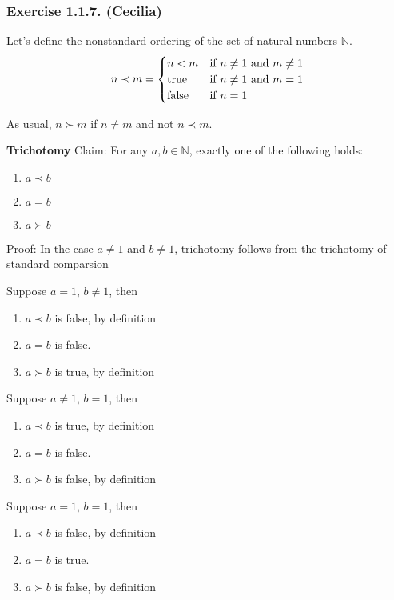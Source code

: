 \subsubsection*{Exercise 1.1.7. (Cecilia)}

\begin{flushleft}

Let's define the nonstandard ordering of the set of natural numbers $\mathbb{N}$.
\begin{equation*}
  n \prec m =
    \begin{cases}
      n < m        & \text{if $ n \ne 1 $ and $ m \ne 1 $} \\
      \text{true}  & \text{if $ n \ne 1 $ and $ m = 1 $} \\
      \text{false} & \text{if $ n = 1 $ }
    \end{cases}
\end{equation*}

As usual, $ n \succ m $ if $ n \ne m $ and not $ n \prec m $.

\textbf{Trichotomy} Claim: For any $ a, b \in \mathbb{N} $, exactly one of the following holds:
\begin{enumerate}
  \item{$ a \prec b $}
  \item{$ a = b $}
  \item{$ a \succ b $}
\end{enumerate}

Proof: In the case $ a \ne 1 $ and $ b \ne 1 $, trichotomy follows from the trichotomy of standard comparsion

Suppose $ a = 1 $, $ b \ne 1 $, then 
\begin{enumerate}
  \item{$ a \prec b $ is false, by definition}
  \item{$ a = b $ is false.}
  \item{$ a \succ b $ is true, by definition}
\end{enumerate}

Suppose $ a \ne 1 $, $ b = 1 $, then 
\begin{enumerate}
  \item{$ a \prec b $ is true, by definition}
  \item{$ a = b $ is false.}
  \item{$ a \succ b $ is false, by definition}
\end{enumerate}

Suppose $ a = 1 $, $ b = 1 $, then 
\begin{enumerate}
  \item{$ a \prec b $ is false, by definition}
  \item{$ a = b $ is true.}
  \item{$ a \succ b $ is false, by definition}
\end{enumerate}


\end{flushleft}
